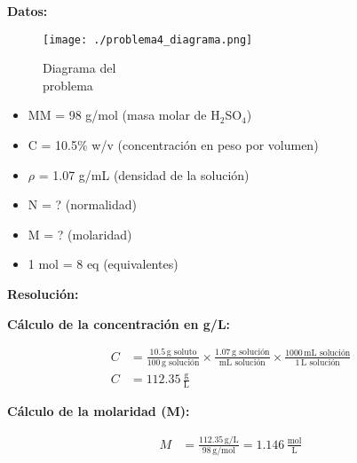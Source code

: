 \documentclass{article}
\begin{document}
\begin{multicols}{2} %
\noindent\textbf{Datos:} %

\begin{figure}[H]
    \begin{minipage}[t]{0.3\textwidth} %
        \raggedright %
        \texttt{[image: ./problema4\_diagrama.png]} %
        \caption{Diagrama del \\ problema}
    \end{minipage}
\end{figure}

\textbf{} %
\begin{itemize}
\item MM = 98 g/mol (masa molar de H$_2$SO$_4$)
\item C = 10.5\% w/v (concentración en peso por volumen)
\item $\rho$ = 1.07 g/mL (densidad de la solución)
\item N = ? (normalidad)
\item M = ? (molaridad)
\item 1 mol = 8 eq (equivalentes)
\end{itemize}

\columnbreak %

\noindent\textbf{Resolución:} %

\textbf{Cálculo de la concentración en g/L:}

\begin{align*}
    C &= \frac{10.5 \, \text{g soluto}}{100 \, \text{g solución}} \times \frac{1.07 \, \text{g solución}}{\text{mL solución}} \times \frac{1000 \, \text{mL solución}}{1 \, \text{L solución}} \\[10pt]
    C &= 112.35 \, \frac{\text{g}}{\text{L}}
\end{align*}

\textbf{Cálculo de la molaridad (M):}

\begin{align*}
    M &= \frac{112.35 \, \text{g/L}}{98 \, \text{g/mol}} = 1.146 \, \frac{\text{mol}}{\text{L}}
\end{align*}


\end{multicols}
\end{document}

